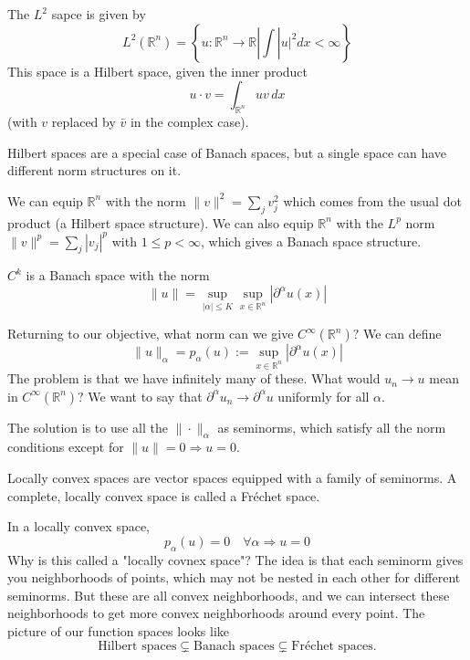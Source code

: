 \begin{example}
The $L^2$ sapce is given by 
$$
L^{2}\left(\mathbb{R}^{n}\right)=\left\{u:\mathbb{R}^{n} \rightarrow \mathbb{R} |\int | u|^{2} d x<\infty\right\}
$$
This space is a Hilbert space, given the inner product
$$
u \cdot v=\int_{\mathbb{R}^{n}} u v\, d x
$$
(with $v$ replaced by $\bar{v}$ in the complex case).
\end{example}

Hilbert spaces are a special case of Banach spaces, but a single space can have different
norm structures on it.

\begin{example}
    We can equip $\mathbb{R}^{n}$ with the norm $\|v\|^{2}=\sum_{j} v_{j}^{2}$ which comes from the usual dot product (a Hilbert space structure). We can also equip $\mathbb{R}^{n}$ with the $L^{p}$ norm $\|v\|^{p}=\sum_{j}\left|v_{j}\right|^{p}$ with $1 \leq p<\infty$, which gives a Banach space structure.
\end{example}

\begin{example}
 $C^{k}$ is a Banach space with the norm
    $$
    \|u\|=\sup _{|\alpha| \leq K} \sup _{x \in \mathbb{R}^{n}}\left|\partial^{\alpha} u(x)\right|
    $$
\end{example}
Returning to our objective, what norm can we give $C^{\infty}\left(\mathbb{R}^{n}\right) ?$ We can define
$$
\|u\|_{\alpha}=p_{\alpha}(u):=\sup _{x \in \mathbb{R}^{n}}\left|\partial^{\alpha} u(x)\right|
$$
The problem is that we have infinitely many of these. What would $u_{n} \rightarrow u$ mean in $C^{\infty}\left(\mathbb{R}^{n}\right) ?$ We want to say that $\partial^{\alpha} u_{n} \rightarrow \partial^{\alpha} u$ uniformly for all $\alpha$.

The solution is to use all the $\|\cdot\|_{\alpha}$ as seminorms, which satisfy all the norm conditions except for $\|u\|=0 \Longrightarrow u=0$.

\begin{definition}
     Locally convex spaces are vector spaces equipped with a family of seminorms. A complete, locally convex space is called a Fr\'echet space.
\end{definition}
In a locally convex space,
$$
p_{\alpha}(u)=0 \quad \forall \alpha \Longrightarrow u=0
$$
Why is this called a "locally covnex space"? The idea is that each seminorm gives you neighborhoods of points, which may not be nested in each other for different seminorms. But these are all convex neighborhoods, and we can intersect these neighborhoods to get more convex neighborhoods around every point.
The picture of our function spaces looks like
\[
    \text{Hilbert spaces} \subsetneq  \text{Banach spaces} \subsetneq \text{Fréchet spaces}.  
\]

